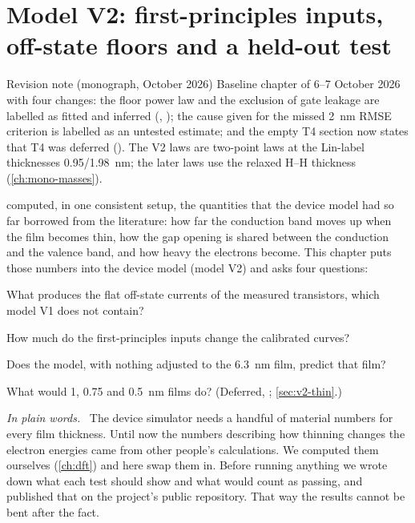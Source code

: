 \newenvironment{v2plain}{\par\medskip\noindent\textit{In plain words.}\ }{\par\medskip}

\chapter{Model V2: first-principles inputs, off-state floors and a held-out test}
\label{ch:v2}

\begin{statusbox}{Revision note (monograph, October 2026)}
Baseline chapter of 6--7 October 2026 with four changes: the floor power law and the exclusion of gate
leakage are labelled as fitted and inferred (, ); the cause given for the missed 2~nm
RMSE criterion is labelled as an untested estimate; and the empty T4 section now states that T4 was deferred
(). The V2 laws are two-point laws at the Lin-label thicknesses 0.95/1.98~nm; the later laws use
the relaxed H--H thickness (\cref{ch:mono-masses}).
\end{statusbox}

 computed, in one consistent setup, the quantities that the device model had so far borrowed from the
literature: how far the conduction band moves up when the film becomes thin, how the gap opening is shared between the
conduction and the valence band, and how heavy the electrons become. This chapter puts those numbers into the device
model (model V2) and asks four questions:
\begin{description}[leftmargin=1.2em]
\item[V1] What produces the flat off-state currents of the measured transistors, which model V1 does not contain?
\item[V2] How much do the first-principles inputs change the calibrated curves?
\item[V3] Does the model, with nothing adjusted to the 6.3~nm film, predict that film?
\item[V4] What would 1, 0.75 and 0.5~nm films do? (Deferred, ; \cref{sec:v2-thin}.)
\end{description}

\begin{v2plain}
The device simulator needs a handful of material numbers for every film thickness. Until now the numbers describing
how thinning changes the electron energies came from other people's calculations. We computed them ourselves
(\cref{ch:dft}) and here swap them in. Before running anything we wrote down what each test should show and what
would count as passing, and published that on the project's public repository. That way the results cannot be
bent after the fact.
\end{v2plain}

